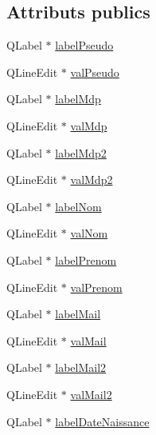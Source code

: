 \subsection*{Attributs publics}
\begin{DoxyCompactItemize}
\item 
Q\-Label $\ast$ \hyperlink{class_ui___dialog_inscription_ad6cbb361ce390cc8ebf99e4774d5b21d}{label\-Pseudo}
\item 
Q\-Line\-Edit $\ast$ \hyperlink{class_ui___dialog_inscription_a5893587115e987676400b0a5912ef6a8}{val\-Pseudo}
\item 
Q\-Label $\ast$ \hyperlink{class_ui___dialog_inscription_a3a3bb8c1384c3ddc6e30cce2d5f006be}{label\-Mdp}
\item 
Q\-Line\-Edit $\ast$ \hyperlink{class_ui___dialog_inscription_aecfee6e95908c76088f926cc4273c661}{val\-Mdp}
\item 
Q\-Label $\ast$ \hyperlink{class_ui___dialog_inscription_a40577873306a0cff844f092596900be6}{label\-Mdp2}
\item 
Q\-Line\-Edit $\ast$ \hyperlink{class_ui___dialog_inscription_aeaf99f06b2313bebaa084ff3b962b377}{val\-Mdp2}
\item 
Q\-Label $\ast$ \hyperlink{class_ui___dialog_inscription_a37335311fc697d84e29041a28c0b3a16}{label\-Nom}
\item 
Q\-Line\-Edit $\ast$ \hyperlink{class_ui___dialog_inscription_a5f1ec1d09785e1f5da1d3d436a9a4e00}{val\-Nom}
\item 
Q\-Label $\ast$ \hyperlink{class_ui___dialog_inscription_a90652e248fbff5e80d7ae7f465f3c67a}{label\-Prenom}
\item 
Q\-Line\-Edit $\ast$ \hyperlink{class_ui___dialog_inscription_a9fcf8c25b58d8d186801291b351f71a6}{val\-Prenom}
\item 
Q\-Label $\ast$ \hyperlink{class_ui___dialog_inscription_aa8405fd8a2dba259c85174fbd1815025}{label\-Mail}
\item 
Q\-Line\-Edit $\ast$ \hyperlink{class_ui___dialog_inscription_a620d0c3971f7a8134de43c5cb4141d0b}{val\-Mail}
\item 
Q\-Label $\ast$ \hyperlink{class_ui___dialog_inscription_a83b16295a5660be94337009689309625}{label\-Mail2}
\item 
Q\-Line\-Edit $\ast$ \hyperlink{class_ui___dialog_inscription_a2117b03c051572a35de79494744e2161}{val\-Mail2}
\item 
Q\-Label $\ast$ \hyperlink{class_ui___dialog_inscription_a41ff3fa5247196c1a310781633672ea7}{label\-Date\-Naissance}
\item 

\end{DoxyCompactItemize}
